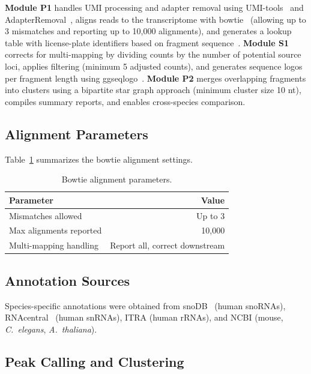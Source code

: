 \documentclass[11pt]{article}
\begin{document}
\textbf{Module P1} handles UMI processing and adapter removal using UMI-tools~\citep{smith2017umi} and AdapterRemoval~\citep{schubert2016adapterremoval}, aligns reads to the transcriptome with bowtie~\citep{langmead2009bowtie} (allowing up to 3 mismatches and reporting up to 10,000 alignments), and generates a lookup table with license-plate identifiers based on fragment sequence~\citep{loher2017mintmap}.  \textbf{Module S1} corrects for multi-mapping by dividing counts by the number of potential source loci, applies filtering (minimum 5 adjusted counts), and generates sequence logos per fragment length using ggseqlogo~\citep{wagih2017ggseqlogo}.  \textbf{Module P2} merges overlapping fragments into clusters using a bipartite star graph approach (minimum cluster size 10 nt), compiles summary reports, and enables cross-species comparison.

\subsection{Alignment Parameters}

Table~\ref{tab:alignment} summarizes the bowtie alignment settings.

\begin{table}[ht]
\centering
\caption{Bowtie alignment parameters.}
\label{tab:alignment}
\begin{tabular}{@{}lr@{}}
\toprule
Parameter & Value \\
\midrule
Mismatches allowed & Up to 3 \\
Max alignments reported & 10,000 \\
Multi-mapping handling & Report all, correct downstream \\
\bottomrule
\end{tabular}
\end{table}

\subsection{Annotation Sources}

Species-specific annotations were obtained from snoDB~\citep{jorjani2016snodb} (human snoRNAs), RNAcentral~\citep{rnacentral2021} (human snRNAs), ITRA (human rRNAs), and NCBI (mouse, \emph{C.\ elegans}, \emph{A.\ thaliana}).

\subsection{Peak Calling and Clustering}
\end{document}
